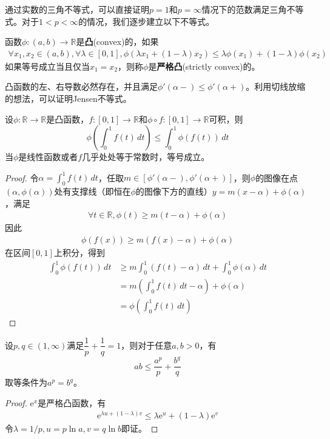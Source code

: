 通过实数的三角不等式，可以直接证明$p=1$和$p=\infty$情况下的范数满足三角不等式。对于$1<p<\infty$的情况，我们逐步建立以下不等式。

\begin{definition}[凸函数]
    函数$\phi:(a,b)\to\mathbb{R}$是\textbf{凸}(convex)的，如果\begin{align*}
        \forall x_1,x_2\in(a,b),\forall \lambda\in[0,1],\phi(\lambda x_1+(1-\lambda)x_2)\leq \lambda\phi(x_1)+(1-\lambda)\phi(x_2)
    \end{align*}
    如果等号成立当且仅当$x_1=x_2$，则称$\phi$是\textbf{严格凸}(strictly convex)的。
\end{definition}

凸函数的左、右导数必然存在，并且满足$\phi'(\alpha-)\leq \phi'(\alpha+)$。利用切线放缩的想法，可以证明Jensen不等式。

\begin{theorem}[Jensen不等式]
    设$\phi:\mathbb{R}\to\mathbb{R}$是凸函数，$f:[0,1]\to\mathbb{R}$和$\phi\circ f:[0,1]\to\mathbb{R}$可积，则
    \[\phi\left(\int_0^1 f(t)\,dt\right)\leq \int_0^1 \phi(f(t))\,dt\]
    当$\phi$是线性函数或者$f$几乎处处等于常数时，等号成立。
\end{theorem}
\begin{proof}
    令$\alpha=\int_0^1 f(t)\,dt$，任取$m\in[\phi'(\alpha-),\phi'(\alpha+)]$，则$\phi$的图像在点$(\alpha,\phi(\alpha))$处有支撑线（即恒在$\phi$的图像下方的直线）$y=m(x-\alpha)+\phi(\alpha)$，满足\begin{align*}
        \forall t\in\mathbb{R},\phi(t)\geq m(t-\alpha)+\phi(\alpha)
    \end{align*}
    因此\begin{align*}
        \phi(f(x))\geq m(f(x)-\alpha)+\phi(\alpha)
    \end{align*}
    在区间$[0,1]$上积分，得到\begin{align*}
        \int_0^1 \phi(f(t))\,dt & \geq m\int_0^1 (f(t)-\alpha)\,dt+\int_0^1 \phi(\alpha)\,dt \\
                   & =m\left(\int_0^1 f(t)\,dt-\alpha\right)+\phi(\alpha) \\
                   & =\phi\left(\int_0^1 f(t)\,dt\right)
    \end{align*}
\end{proof}

\begin{theorem}[Young不等式]
    设$p,q\in(1,\infty)$满足$\dfrac{1}{p}+\dfrac{1}{q}=1$，则对于任意$a,b>0$，有
    \[ab\leq \frac{a^p}{p}+\frac{b^q}{q}\]
    取等条件为$a^p=b^q$。
\end{theorem}
\begin{proof}
    $\mathrm{e}^x$是严格凸函数，有\begin{align*}
        \mathrm{e}^{\lambda u+(1-\lambda)v}  \leq \lambda \mathrm{e}^u+(1-\lambda)\mathrm{e}^v
    \end{align*}
    令$\lambda=1/p,u=p\ln a,v=q\ln b$即证。
\end{proof}

